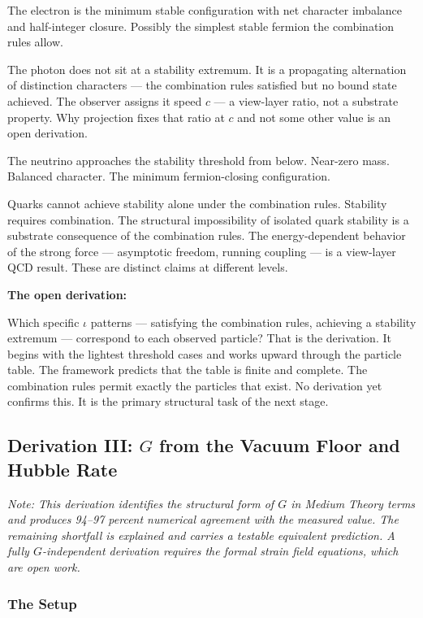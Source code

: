 \documentclass[11pt,letterpaper]{article}
\begin{document}
The electron is the minimum stable configuration with net character imbalance and half-integer closure. Possibly the simplest stable fermion the combination rules allow.

The photon does not sit at a stability extremum. It is a propagating alternation of distinction characters --- the combination rules satisfied but no bound state achieved. The observer assigns it speed \(c\) --- a view-layer ratio, not a substrate property. Why projection fixes that ratio at \(c\) and not some other value is an open derivation.

The neutrino approaches the stability threshold from below. Near-zero mass. Balanced character. The minimum fermion-closing configuration.

Quarks cannot achieve stability alone under the combination rules. Stability requires combination. The structural impossibility of isolated quark stability is a substrate consequence of the combination rules. The energy-dependent behavior of the strong force --- asymptotic freedom, running coupling --- is a view-layer QCD result. These are distinct claims at different levels.

\textbf{The open derivation:}

Which specific \(\iota\) patterns --- satisfying the combination rules, achieving a stability extremum --- correspond to each observed particle? That is the derivation. It begins with the lightest threshold cases and works upward through the particle table. The framework predicts that the table is finite and complete. The combination rules permit exactly the particles that exist. No derivation yet confirms this. It is the primary structural task of the next stage.

\subsection{Derivation III: \(G\) from the Vacuum Floor and Hubble Rate}
\label{sec:org4e78046}

\emph{Note: This derivation identifies the structural form of \(G\) in Medium Theory terms and produces 94--97 percent numerical agreement with the measured value. The remaining shortfall is explained and carries a testable equivalent prediction. A fully \(G\)-independent derivation requires the formal strain field equations, which are open work.}

\subsubsection{The Setup}
\label{sec:orge2495e9}
\end{document}
